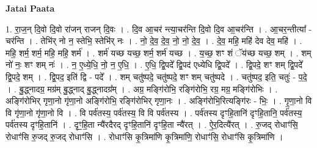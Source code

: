 \documentclass[17pt]{extarticle}
\begin{document}
\textbf{Jatai Paata} \newline

1. रा॒ज॒न् दि॒वो दि॒वो रा॑जन् राजन् दि॒वः । . दि॒व आ॒चर॑ न्त्या॒चर॑न्ति दि॒वो दि॒व आ॒चर॑न्ति । . आ॒चर॒न्तीत्या᳚ - चर॑न्ति । . तेभि॑र् नो न॒ स्तेभि॒ स्तेभि॑र् नः । . नो॒ दे॒व॒ दे॒व॒ नो॒ नो॒ दे॒व॒ । . दे॒व॒ महि॒ महि॑ देव देव॒ महि॑ । . महि॒ शर्म॒ शर्म॒ महि॒ महि॒ शर्म॑ । . शर्म॑ यच्छ यच्छ॒ शर्म॒ शर्म॑ यच्छ । . य॒च्छ॒ शꣳ शं ॅय॑च्छ यच्छ॒ शम् । . शम् नो॑ नः॒ शꣳ शम् नः॑ । . न॒ ए॒ध्ये॒धि॒ नो॒ न॒ ए॒धि॒ । . ए॒धि॒ द्वि॒पदे᳚ द्वि॒पद॑ एध्येधि द्वि॒पदे᳚ । . द्वि॒पदे॒ शꣳ शम् द्वि॒पदे᳚ द्वि॒पदे॒ शम् । . द्वि॒पद॒ इति॑ द्वि - पदे᳚ । . शम् चतु॑ष्पदे॒ चतु॑ष्पदे॒ शꣳ शम् चतु॑ष्पदे । . चतु॑ष्पद॒ इति॒ चतुः॑ - प॒दे॒ । . बु॒द्ध्नादग्र॒ मग्र॑म् बु॒द्ध्नाद् बु॒द्ध्नादग्र᳚म् । . अग्र॒ मङ्गि॑रोभि॒ रङ्गि॑रोभि॒ रग्र॒ मग्र॒ मङ्गि॑रोभिः । . अङ्गि॑रोभिर् गृणा॒नो गृ॑णा॒नो अङ्गि॑रोभि॒ रङ्गि॑रोभिर् गृणा॒नः । . अङ्गि॑रोभि॒रित्यङ्गि॑रः - भिः॒ । . गृ॒णा॒नो वि वि गृ॑णा॒नो गृ॑णा॒नो वि । . वि पर्व॑तस्य॒ पर्व॑तस्य॒ वि वि पर्व॑तस्य । . पर्व॑तस्य दृꣳहि॒तानि॑ दृꣳहि॒तानि॒ पर्व॑तस्य॒ पर्व॑तस्य दृꣳहि॒तानि॑ । . दृꣳ॒॒हि॒ता न्यै॑रदैरद् दृꣳहि॒तानि॑ दृꣳहि॒ता न्यै॑रत् । . ऐ॒र॒दित्यै॑रत् । . रु॒जद् रोधाꣳ॑सि॒ रोधाꣳ॑सि रु॒जद् रु॒जद् रोधाꣳ॑सि । . रोधाꣳ॑सि कृ॒त्रिमा॑णि कृ॒त्रिमा॑णि॒ रोधाꣳ॑सि॒ रोधाꣳ॑सि कृ॒त्रिमा॑णि । \newline
\end{document}
